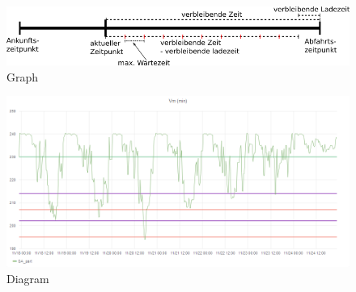 \begin{figure}[htb]
	\includegraphics[width = \linewidth]{img/SA_waiting_Graph3.png}
	\caption{Graph}
	\label{SAWait:Graph}
\end{figure}
\begin{figure}[htb]
	\includegraphics[width=\linewidth]{img/dia1.png}
	\caption{Diagram}
	\label{dia1}
\end{figure}

